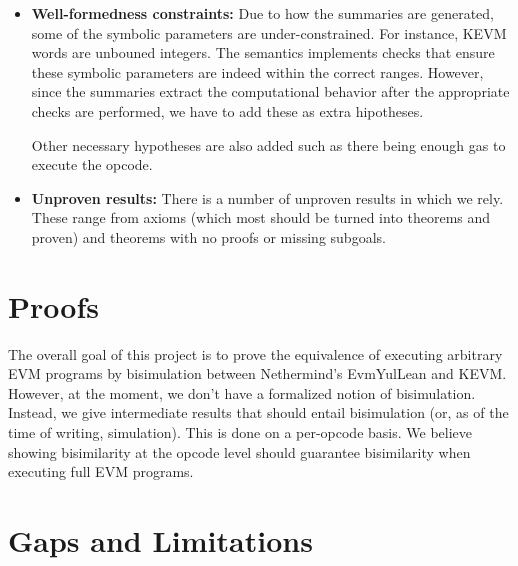 \begin{itemize}
\item \textbf{Well-formedness constraints:} Due to how the summaries are generated, some of the symbolic parameters are under-constrained. For instance, KEVM words are unbouned integers.
  The semantics implements checks that ensure these symbolic parameters are indeed within the correct ranges. However, since the summaries extract the computational behavior after the appropriate checks are performed, we have to add these as extra hipotheses.

  Other necessary hypotheses are also added such as there being enough gas to execute the opcode.
\item \textbf{Unproven results:} There is a number of unproven results in which we rely. These range from axioms (which most should be turned into theorems and proven) and theorems with no proofs or missing subgoals.
\end{itemize}

\section{Proofs}

The overall goal of this project is to prove the equivalence of executing arbitrary EVM programs by bisimulation between Nethermind's EvmYulLean and KEVM.
However, at the moment, we don't have a formalized notion of bisimulation.
Instead, we give intermediate results that should entail bisimulation (or, as of the time of writing, simulation).
This is done on a per-opcode basis. We believe showing bisimilarity at the opcode level should guarantee bisimilarity when executing full EVM programs.

\section{Gaps and Limitations}

